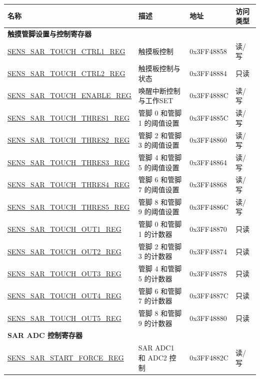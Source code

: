 
\begin{longtable}{ |p{6cm}|p{5cm}|p{2cm}|p{2cm}| }
\hline\rowcolor{lightgray}
名称 & 描述 &  地址 & 访问类型 \\ \hline
\multicolumn{4}{|l|}{\textbf{触摸管脚设置与控制寄存器}} \\ \hline
\hyperref[regdesc:SENSSARTOUCHCTRL1REG]{SENS\_SAR\_TOUCH\_CTRL1\_REG} & 触摸板控制 & 0x3FF48858 & 读/写 \\ \hline
\hyperref[regdesc:SENSSARTOUCHCTRL2REG]{SENS\_SAR\_TOUCH\_CTRL2\_REG} & 触摸板控制与状态 & 0x3FF48884 & 只读 \\ \hline
\hyperref[regdesc:SENSSARTOUCHENABLEREG]{SENS\_SAR\_TOUCH\_ENABLE\_REG} & 唤醒中断控制与工作SET & 0x3FF4888C & 读/写 \\ \hline
\hyperref[regdesc:SENSSARTOUCHTHRES1REG]{SENS\_SAR\_TOUCH\_THRES1\_REG} & 管脚 0 和管脚 1 的阈值设置 & 0x3FF4885C & 读/写 \\ \hline
\hyperref[regdesc:SENSSARTOUCHTHRES2REG]{SENS\_SAR\_TOUCH\_THRES2\_REG} & 管脚 2 和管脚 3 的阈值设置 & 0x3FF48860 & 读/写 \\ \hline
\hyperref[regdesc:SENSSARTOUCHTHRES3REG]{SENS\_SAR\_TOUCH\_THRES3\_REG} & 管脚 4 和管脚 5 的阈值设置 & 0x3FF48864 & 读/写 \\ \hline
\hyperref[regdesc:SENSSARTOUCHTHRES4REG]{SENS\_SAR\_TOUCH\_THRES4\_REG} & 管脚 6 和管脚 7 的阈值设置 & 0x3FF48868 & 读/写 \\ \hline
\hyperref[regdesc:SENSSARTOUCHTHRES5REG]{SENS\_SAR\_TOUCH\_THRES5\_REG} & 管脚 8 和管脚 9 的阈值设置 & 0x3FF4886C & 读/写 \\ \hline
\hyperref[regdesc:SENSSARTOUCHOUT1REG]{SENS\_SAR\_TOUCH\_OUT1\_REG} & 管脚 0 和管脚 1 的计数器 & 0x3FF48870 & 只读 \\ \hline
\hyperref[regdesc:SENSSARTOUCHOUT2REG]{SENS\_SAR\_TOUCH\_OUT2\_REG} & 管脚 2 和管脚 3 的计数器 & 0x3FF48874 & 只读 \\ \hline
\hyperref[regdesc:SENSSARTOUCHOUT3REG]{SENS\_SAR\_TOUCH\_OUT3\_REG} & 管脚 4 和管脚 5 的计数器 & 0x3FF48878 & 只读 \\ \hline
\hyperref[regdesc:SENSSARTOUCHOUT4REG]{SENS\_SAR\_TOUCH\_OUT4\_REG} & 管脚 6 和管脚 7 的计数器 & 0x3FF4887C & 只读 \\ \hline
\hyperref[regdesc:SENSSARTOUCHOUT5REG]{SENS\_SAR\_TOUCH\_OUT5\_REG} & 管脚 8 和管脚 9 的计数器 & 0x3FF48880 & 只读 \\ \hline
\multicolumn{4}{|l|}{\textbf{SAR ADC 控制寄存器}} \\ \hline
\hyperref[regdesc:SENSSARSTARTFORCEREG]{SENS\_SAR\_START\_FORCE\_REG} & SAR ADC1 和 ADC2 控制 & 0x3FF4882C & 读/写 \\ \hline

\end{longtable}
